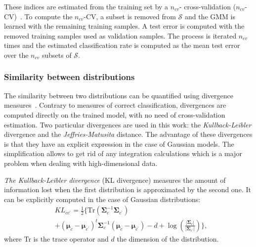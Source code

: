\documentclass[journal,10pt]{IEEEtran}
\begin{document}
        These  indices  are  estimated  from the  training  set  by  a
        $n_{cv}$- cross-validation ($n_{cv}$-CV)~\cite{opac-b1127878}.
        To  compute   the  $n_{cv}$-CV,  a  subset   is  removed  from
        $\mathcal{S}$  and  the  GMM  is learned  with  the  remaining
        training samples.  A test error  is computed with  the removed
        training samples  used as validation samples.   The process is
        iterated $n_{cv}$ times and  the estimated classification rate
        is computed as  the mean test error over  the $n_{cv}$ subsets
        of $\mathcal{S}$.

        \subsubsection{Similarity between distributions}
        The similarity  between two distributions can be  quantified using
        divergence  measures~\cite{opac-b1097517}. Contrary  to measures
        of correct  classification, divergences are  computed directly
        on  the  trained  model,  with  no  need  of  cross-validation
        estimation.  Two particular divergences are used in this work:
        the     \emph{Kullback-Leibler}     divergence     and     the
        \emph{Jeffries-Matusita}  distance.   The advantage  of  these
        divergences is  that they have  an explicit expression  in the
        case of Gaussian models. The  simplification allows to get rid
        of  any integration  calculations which  is a  major problem  when
        dealing with high-dimensional data.

        \emph{The   Kullback-Leibler   divergence}   (KL   divergence)
        measures  the  amount  of  information  lost  when  the  first
        distribution     is     approximated     by     the     second
        one\cite{kullback1987letter}. It can be explicitly computed in
        the case of Gaussian distributions:
        \begin{align}
            &KL_{cc^\prime} = \frac{1}{2} \biggl\{ \text{Tr} (\boldsymbol{\Sigma}_c^{-1} \boldsymbol{\Sigma}_{c^\prime}) \nonumber \\
            & + (\boldsymbol{\mu}_c - \boldsymbol{\mu}_{c^\prime})^t \boldsymbol{\Sigma}_c^{-1} (\boldsymbol{\mu}_c - \boldsymbol{\mu}_{c^\prime}) - d + \log \left( \frac{|\boldsymbol{\Sigma}_c|}{|\boldsymbol{\Sigma}_{c^\prime}|} \right) \biggr\},
        \end{align}
        where Tr is the trace operator and $d$ the dimension of the distribution.
\end{document}
